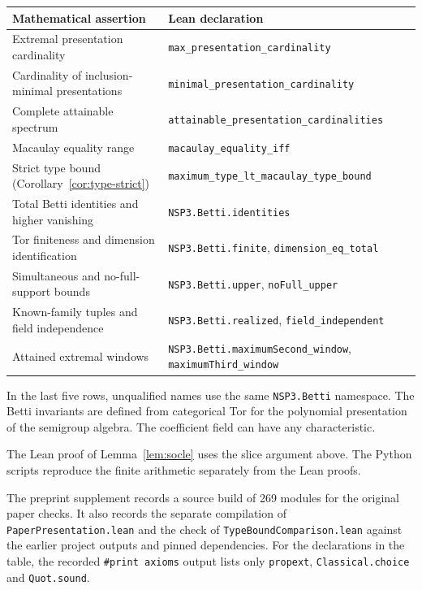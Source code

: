 \documentclass[11pt]{article}
\theoremstyle{definition}
\theoremstyle{remark}
\theoremstyle{plain}
\begin{document}
\begin{center}\small
\begin{tabular}{@{}>{\raggedright\arraybackslash}p{.41\linewidth}>{\raggedright\arraybackslash}p{.53\linewidth}@{}}\toprule
Mathematical assertion&Lean declaration\\\midrule
Extremal presentation cardinality&\texttt{max\_presentation\_cardinality}\\
Cardinality of inclusion-minimal presentations&\texttt{minimal\_presentation\_cardinality}\\
Complete attainable spectrum&\texttt{attainable\_presentation\_cardinalities}\\
Macaulay equality range&\texttt{macaulay\_equality\_iff}\\
Strict type bound (Corollary~\ref{cor:type-strict})&\texttt{maximum\_type\_lt\_macaulay\_type\_bound}\\
Total Betti identities and higher vanishing&\texttt{NSP3.Betti.identities}\\
Tor finiteness and dimension identification&\texttt{NSP3.Betti.finite}, \texttt{dimension\_eq\_total}\\
Simultaneous and no-full-support bounds&\texttt{NSP3.Betti.upper}, \texttt{noFull\_upper}\\
Known-family tuples and field independence&\texttt{NSP3.Betti.realized}, \texttt{field\_independent}\\
Attained extremal windows&\texttt{NSP3.Betti.maximumSecond\_window}, \texttt{maximumThird\_window}\\\bottomrule
\end{tabular}
\end{center}
In the last five rows, unqualified names use the same
\texttt{NSP3.Betti} namespace. The Betti invariants are defined from
categorical Tor for the polynomial presentation of the semigroup
algebra. The coefficient field can have any characteristic.

The Lean proof of Lemma~\ref{lem:socle} uses the slice argument above.
The Python scripts reproduce the finite arithmetic separately from the Lean proofs.

The preprint supplement records a source build of 269 modules for the
original paper checks. It also records the separate compilation of
\texttt{PaperPresentation.lean} and the check of
\texttt{TypeBoundComparison.lean} against the earlier project outputs
and pinned dependencies. For the declarations in the table, the
recorded \texttt{\#print axioms} output lists only \texttt{propext},
\texttt{Classical.choice} and \texttt{Quot.sound}.
\end{document}

